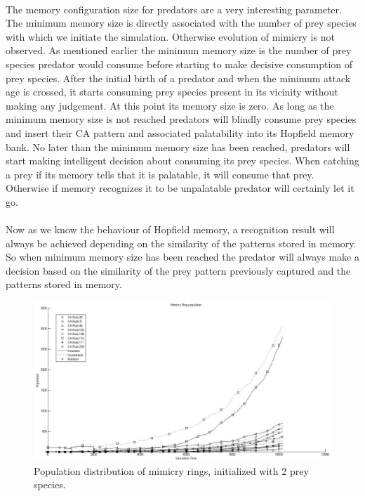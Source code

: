 \paragraph{}
The memory configuration size for predators are a very interesting parameter. The minimum memory size is directly associated with the number of prey species with which we initiate the simulation. Otherwise evolution of mimicry is not observed. As mentioned earlier the minimum memory size is the number of prey species predator would consume before starting to make decisive consumption of prey species. After the initial birth of a predator and when the minimum attack age is crossed, it starts consuming prey species present in its vicinity without making any judgement. At this point its memory size is zero. As long as the minimum memory size is not reached predators will blindly consume prey species and insert their CA pattern and associated palatability into its Hopfield memory bank. No later than the minimum memory size has been reached, predators will start making intelligent decision about consuming its prey species. When catching a prey if its memory tells that it is palatable, it will consume that prey. Otherwise if memory recognizes it to be unpalatable predator will certainly let it go.

\paragraph{}
Now as we know the behaviour of Hopfield memory, a recognition result will always be achieved depending on the similarity of the patterns stored in memory. So when minimum memory size has been reached the predator will always make a decision based on the similarity of the prey pattern previously captured and the patterns stored in memory.

\begin{figure}
	\centering
	\includegraphics[scale=0.40]{images/simTime10k-2Prey}
	\caption{Population distribution of mimicry rings, initialized with 2 prey species.}
	\label{fig:plot-2-prey}
\end{figure}

